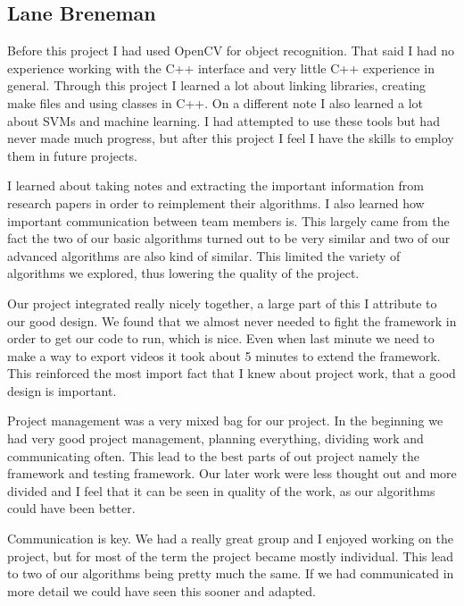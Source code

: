 \documentclass[letterpaper,10pt,titlepage]{article}
\begin{document}
\subsection*{Lane Breneman}

Before this project I had used OpenCV for object recognition. That said I had
no experience working with the C++ interface and very little C++ experience in
general. Through this project I learned a lot about linking libraries, creating
make files and using classes in C++. On a different note I also learned a lot
about SVMs and machine learning. I had attempted to use these tools but had
never made much progress, but after this project I feel I have the skills to
employ them in future projects.

I learned about taking notes and extracting the important information from 
research papers in order to reimplement their algorithms. I also learned 
how important communication between team members is. This largely came from
the fact the two of our basic algorithms turned out to be very similar and 
two of our advanced algorithms are also kind of similar. This limited the
variety of algorithms we explored, thus lowering the quality of the project.

Our project integrated really nicely together, a large part of this I 
attribute to our good design. We found that we almost never needed to
fight the framework in order to get our code to run, which is nice. 
Even when last minute we need to make a way to export videos it took 
about 5 minutes to extend the framework. This reinforced the most 
import fact that I knew about project work, that a good design is 
important.

Project management was a very mixed bag for our project. In the 
beginning we had very good project management, planning everything,
dividing work and communicating often. This lead to the best parts
of out project namely the framework and testing framework. Our later work
were less thought out and more divided and I feel that it can be seen in
quality of the work, as our algorithms could have been better.

Communication is key. We had a really great group and I enjoyed working on the
project, but for most of the term the project became mostly individual. This lead
to two of our algorithms being pretty much the same. If we had communicated in 
more detail we could have seen this sooner and adapted.
\end{document}
